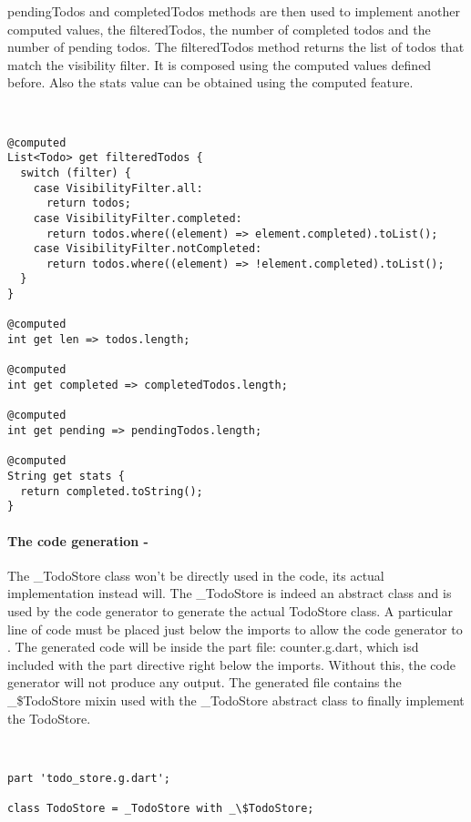 pendingTodos and completedTodos methods are then used to implement another computed values, the filteredTodos, the number of completed todos and the number of pending todos. The filteredTodos method returns the list of todos that match the visibility filter. It is composed using the computed values defined before. Also the stats value can be obtained using the computed feature.
\begin{code}
\mbox{}\\
 \mbox{}
		\label{code:2.14}
\begin{verbatim}
@computed
List<Todo> get filteredTodos {
  switch (filter) {
    case VisibilityFilter.all:
      return todos;
    case VisibilityFilter.completed:
      return todos.where((element) => element.completed).toList();
    case VisibilityFilter.notCompleted:
      return todos.where((element) => !element.completed).toList();
  }
}

@computed
int get len => todos.length;

@computed
int get completed => completedTodos.length;

@computed
int get pending => pendingTodos.length;

@computed
String get stats {
  return completed.toString();
}
\end{verbatim}
\mbox{}
\end{code}

\paragraph{The code generation - }
\label{subpar:todo_app_bloc_core_state}The \_TodoStore class won’t be directly used in the code, its actual implementation instead will. The _TodoStore is indeed an abstract class and is used by the code generator to generate the actual TodoStore class. A particular line of code must be placed just below the imports to allow the code generator to . The generated code will be inside the part file: counter.g.dart, which isd included with the part directive right below the imports. Without this, the code generator will not produce any output. The generated file contains the _\$TodoStore mixin used with the _TodoStore abstract class to finally implement the TodoStore.
\begin{code}
\mbox{}\\
 \mbox{}
		\label{code:2.14}
\begin{verbatim}
part 'todo_store.g.dart';

class TodoStore = _TodoStore with _\$TodoStore;
\end{verbatim}
\mbox{}
\end{code}

